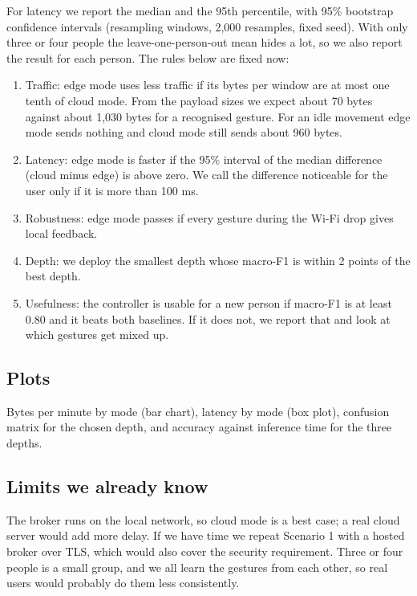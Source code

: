 \documentclass{article}
\begin{document}
For latency we report the median and the 95th percentile, with 95\% bootstrap confidence intervals (resampling windows, 2,000 resamples, fixed seed). With only three or four people the leave-one-person-out mean hides a lot, so we also report the result for each person. The rules below are fixed now:

\begin{enumerate}
\item Traffic: edge mode uses less traffic if its bytes per window are at most one tenth of cloud mode. From the payload sizes we expect about 70 bytes against about 1,030 bytes for a recognised gesture. For an idle movement edge mode sends nothing and cloud mode still sends about 960 bytes.
\item Latency: edge mode is faster if the 95\% interval of the median difference (cloud minus edge) is above zero. We call the difference noticeable for the user only if it is more than 100 ms.
\item Robustness: edge mode passes if every gesture during the Wi-Fi drop gives local feedback.
\item Depth: we deploy the smallest depth whose macro-F1 is within 2 points of the best depth.
\item Usefulness: the controller is usable for a new person if macro-F1 is at least 0.80 and it beats both baselines. If it does not, we report that and look at which gestures get mixed up.
\end{enumerate}

\subsection{Plots}

Bytes per minute by mode (bar chart), latency by mode (box plot), confusion matrix for the chosen depth, and accuracy against inference time for the three depths.

\subsection{Limits we already know}

The broker runs on the local network, so cloud mode is a best case; a real cloud server would add more delay. If we have time we repeat Scenario 1 with a hosted broker over TLS, which would also cover the security requirement. Three or four people is a small group, and we all learn the gestures from each other, so real users would probably do them less consistently.
\end{document}
